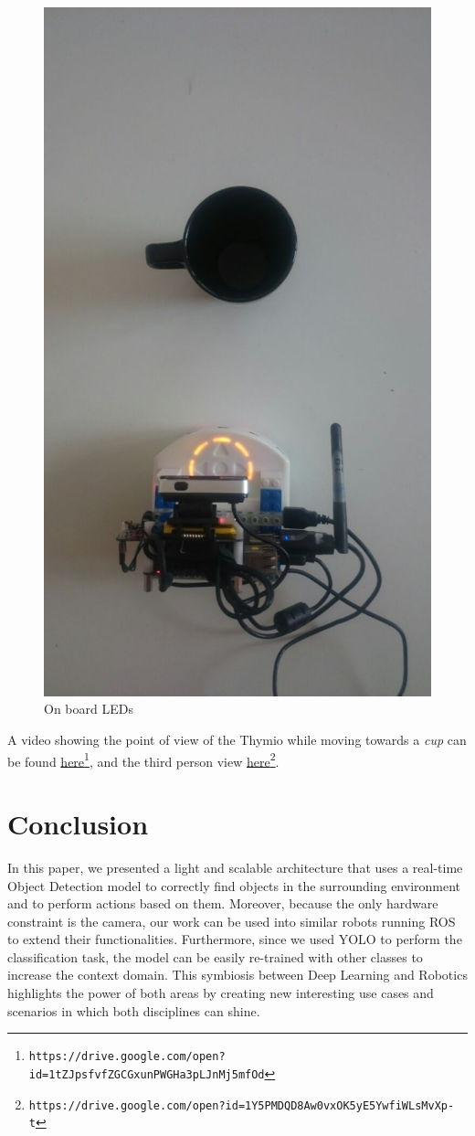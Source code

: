 \documentclass[letterpaper, 10 pt, conference]{ieeeconf}  %
\begin{document}
\begin{figure}[H]
\begin{center}
\includegraphics[width=0.25\linewidth]{images/leds/5}
\end{center}
\caption{On board LEDs}
\end{figure}
A video showing the point of view of the Thymio while moving towards a \emph{cup} can be found \href{https://drive.google.com/open?id=1tZJpsfvfZGCGxunPWGHa3pLJnMj5mfOd}{here}\footnote{\texttt{https://drive.google.com/open?id=1tZJpsfvfZGCGxunPWGHa3pLJnMj5mfOd}}, and the third person view \href{https://drive.google.com/open?id=1Y5PMDQD8Aw0vxOK5yE5YwfiWLsMvXp-t}{here}\footnote{\texttt{https://drive.google.com/open?id=1Y5PMDQD8Aw0vxOK5yE5YwfiWLsMvXp-t}}.
\section{Conclusion}
In this paper, we presented a light and scalable architecture that uses a real-time Object Detection model to correctly find objects in the surrounding environment and to perform actions based on them. Moreover, because the only  hardware constraint is the camera, our work can be used into similar robots running ROS  to extend their functionalities. Furthermore, since we used YOLO to perform the classification task, the model can be easily re-trained with other classes to increase the context domain. This symbiosis between Deep Learning and Robotics highlights the power of both areas by creating new interesting use cases and scenarios in which both disciplines can shine.

\printbibliography

%
\end{document}
